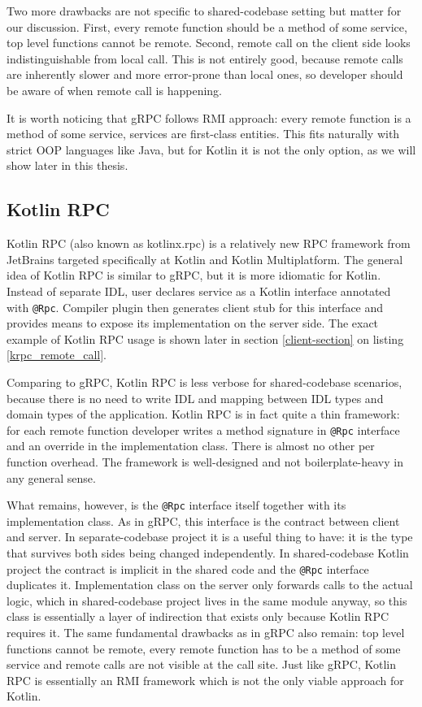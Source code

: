\documentclass[a4paper,11pt,oneside]{article}
\newcommand{\kotlini}[1]{\texttt{#1}}
\begin{document}
Two more drawbacks are not specific to shared-codebase setting but matter for our discussion.
First, every remote function should be a method of some service, top level functions cannot be
remote. Second, remote call on the client side looks indistinguishable from local call. This is
not entirely good, because remote calls are inherently slower and more error-prone than local
ones, so developer should be aware of when remote call is happening.

It is worth noticing that gRPC follows RMI approach: every remote function is a method of some
service, services are first-class entities. This fits naturally with strict OOP languages like
Java, but for Kotlin it is not the only option, as we will show later in this thesis.

\subsection{Kotlin RPC}

Kotlin RPC (also known as kotlinx.rpc) \cite{noauthor_kotlinkotlinxrpc_nodate} is a relatively new
RPC framework from JetBrains targeted specifically at Kotlin and Kotlin Multiplatform. The general
idea of Kotlin RPC is similar to gRPC, but it is more idiomatic for Kotlin. Instead of separate IDL,
user declares service as a Kotlin interface annotated with \kotlini{@Rpc}. Compiler plugin then
generates client stub for this interface and provides means to expose its implementation on the
server side. The exact example of Kotlin RPC usage is shown later in section \ref{client-section}
on listing \ref{krpc_remote_call}.

Comparing to gRPC, Kotlin RPC is less verbose for shared-codebase scenarios, because there is no
need to write IDL and mapping between IDL types and domain types of the application. Kotlin RPC
is in fact quite a thin framework: for each remote function developer writes a method signature in
\kotlini{@Rpc} interface and an override in the implementation class. There is almost no other per
function overhead. The framework is well-designed and not boilerplate-heavy in any general sense.

What remains, however, is the \kotlini{@Rpc} interface itself together with its implementation
class. As in gRPC, this interface is the contract between client and server. In separate-codebase
project it is a useful thing to have: it is the type that survives both sides being changed
independently. In shared-codebase Kotlin project the contract is implicit in the shared code and
the \kotlini{@Rpc} interface duplicates it. Implementation class on the server only forwards calls
to the actual logic, which in shared-codebase project lives in the same module anyway, so this
class is essentially a layer of indirection that exists only because Kotlin RPC requires it. The
same fundamental drawbacks as in gRPC also remain: top level functions cannot be remote, every
remote function has to be a method of some service and remote calls are not visible at the call
site. Just like gRPC, Kotlin RPC is essentially an RMI framework which is not the only viable
approach for Kotlin.
\end{document}
